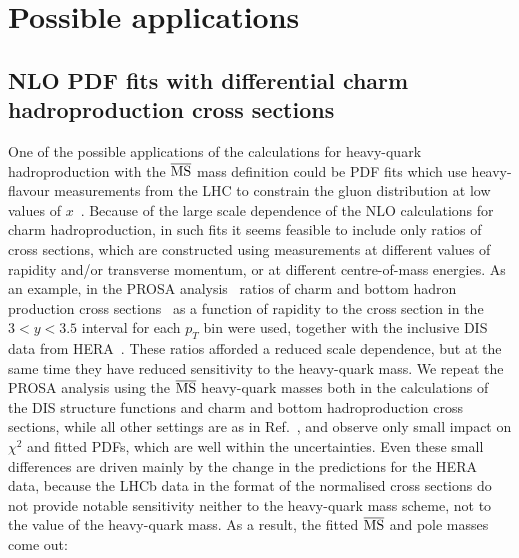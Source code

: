 \documentclass[12pt,a4paper]{article}
\newcommand{\msbar}{\ensuremath{\overline{\rm MS}}\xspace}
\begin{document}
\section{Possible applications}
\label{appli}


\subsection{NLO PDF fits with differential charm hadroproduction cross sections}
One of the possible applications of the calculations for heavy-quark hadroproduction with the \msbar mass definition could be PDF fits which use heavy-flavour measurements from the LHC to constrain the gluon distribution at low values of $x$~\cite{Zenaiev:2015rfa,Gauld:2015yia,Gauld:2016kpd}. Because of the large scale dependence of the NLO calculations for charm hadroproduction, in such fits it seems feasible to include only ratios of cross sections, which are constructed using measurements at different values of rapidity and/or transverse momentum, or at different centre-of-mass energies. As an example, in the PROSA analysis~\cite{Zenaiev:2015rfa} ratios of charm and bottom hadron production cross sections~\cite{Aaij:2013mga,Aaij:2013noa} as a function of rapidity to the cross section in the $3 < y < 3.5$ interval for each $p_T$ bin were used, together with the inclusive DIS data from HERA~\cite{Aaron:2009aa,Abramowicz:1900rp,Abramowicz:2014zub}. These ratios afforded a reduced scale dependence, but at the same time they have reduced sensitivity to the heavy-quark mass. We repeat the PROSA analysis using the \msbar heavy-quark masses both in the calculations of the DIS structure functions and charm and bottom hadroproduction cross sections, while all other settings are as in Ref.~\cite{Zenaiev:2015rfa}, and observe only small impact on $\chi^2$ and fitted PDFs, which are well within the uncertainties. Even these small differences are driven mainly by the change in the predictions for the HERA data, because the LHCb data in the format of the normalised cross sections do not provide notable sensitivity neither to the heavy-quark mass scheme, not to the value of the heavy-quark mass. As a result, the fitted \msbar and pole masses come out:
\end{document}
